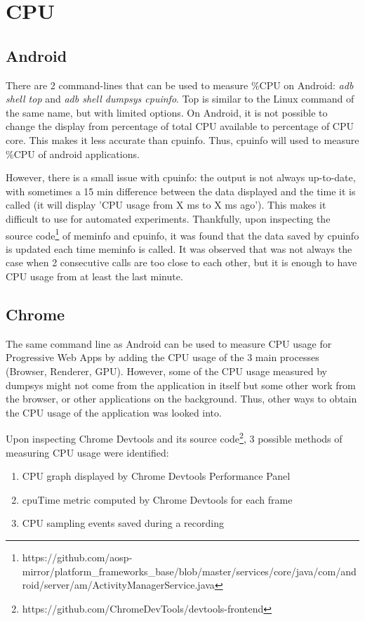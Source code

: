\documentclass{kththesis}
\begin{document}
\section{CPU}
    \subsection{Android}

There are 2 command-lines that can be used to measure \%CPU on Android: \textit{adb shell top} and \textit{adb shell dumpsys cpuinfo}. Top is similar to the Linux command of the same name, but with limited options. On Android, it is not possible to change the display from percentage of total CPU available to percentage of CPU core. This makes it less accurate than cpuinfo. Thus, cpuinfo will used to measure \%CPU of android applications. 

However, there is a small issue with cpuinfo: the output is not always up-to-date, with sometimes a 15 min difference between the data displayed and the time it is called (it will display 'CPU usage from X ms to X ms ago'). This makes it difficult to use for automated experiments. Thankfully, upon inspecting the source code\footnote{https://github.com/aosp-mirror/platform\_frameworks\_base/blob/master/services/core/java/com/android/server/am/ActivityManagerService.java} of meminfo and cpuinfo, it was found that the data saved by cpuinfo is updated each time meminfo is called. It was observed that was not always the case when 2 consecutive calls are too close to each other, but it is enough to have CPU usage from at least the last minute.

    \subsection{Chrome}

The same command line as Android can be used to measure CPU usage for Progressive Web Apps by adding the CPU usage of the 3 main processes (Browser, Renderer, GPU). 
However, some of the CPU usage measured by dumpsys might not come from the application in itself but some other work from the browser, or other applications on the background. 
Thus, other ways to obtain the CPU usage of the application was looked into. 

Upon inspecting Chrome Devtools and its source code\footnote{https://github.com/ChromeDevTools/devtools-frontend}, 3 possible methods of measuring CPU usage were identified:
\begin{enumerate}
    \item CPU graph displayed by Chrome Devtools Performance Panel
    \item cpuTime metric computed by Chrome Devtools for each frame
    \item CPU sampling events saved during a recording
\end{enumerate}
\end{document}
